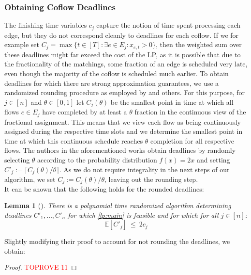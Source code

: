 \documentclass[11pt]{article}
\newtheorem{lemma}[theorem]{Lemma}
\begin{document}
\subsubsection*{Obtaining Coflow Deadlines}
The finishing time variables $c_j$ capture the notion of time spent processing each edge, but they do not correspond cleanly to deadlines for each coflow. If we for example set $C_j = \max\{t \in [T]: \exists e \in E_j: x_{e,t} > 0\}$, then the weighted sum over these deadlines might far exceed the cost of the LP, as it is possible that due to the fractionality of the matchings, some fraction of an edge is scheduled very late, even though the majority of the coflow is scheduled much earlier. To obtain deadlines for which there are strong approximation guarantees, we use a randomized rounding procedure as employed by \cite{fukunaga22,im19} and others.
For this purpose, for $j \in [n]$ and $\theta \in [0,1]$ let $C_j(\theta)$ be the smallest point in time at which all flows $e \in E_j$ have completed by at least a $\theta$ fraction in the continuous view of the fractional assignment. This means that we view each flow as being continuously assigned during the respective time slots and we determine the smallest point in time at which this continuous schedule reaches $\theta$ completion for all respective flows. The authors in the aforementioned works obtain deadlines by randomly selecting $\theta$ according to the probability distribution $f(x)=2x$ and setting $C'_j := \lceil C_j(\theta)/\theta\rceil$. As we do not require integrality in the next steps of our algorithm, we set $C_j := C_j(\theta)/\theta$, leaving out the rounding step.\\
It can be shown that the following holds for the rounded deadlines:

\begin{lemma}[\cite{im19}]\label{lemma:2approxold}
There is a polynomial time randomized algorithm determining deadlines $C'_1,\dotsc,C'_n$ for which \ref{lp:main} is feasible and for which for all $j \in [n]$:
\begin{equation*}
\mathbb{E}[C'_j] \ \le\  2c_j    
\end{equation*}
\end{lemma}

\noindent Slightly modifying their proof to account for not rounding the deadlines, we obtain:

\rslemmatwoapproxstrong*

\begin{proof}\textcolor{red}{TOPROVE 11}\end{proof}
\end{document}
